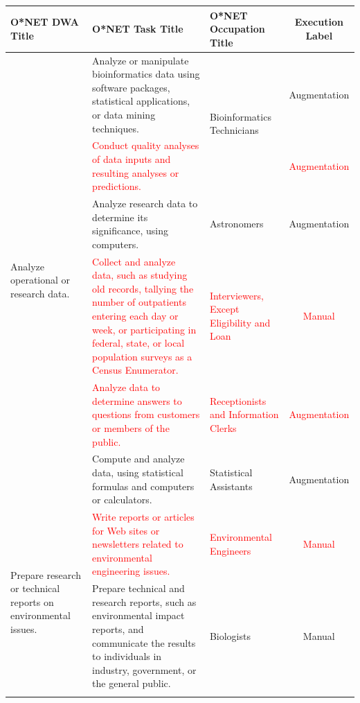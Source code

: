\begin{tabular}{|l|p{15cm}|l|c|}
\hline
\textbf{O*NET DWA Title} & \textbf{O*NET Task Title} & \textbf{O*NET Occupation Title} & \textbf{Execution Label} \\
\hline

\multirow{6}{*}{Analyze operational or research data.} &
Analyze or manipulate bioinformatics data using software packages, statistical applications, or data mining techniques. &
\multirow{2}{*}{Bioinformatics Technicians} & Augmentation \\ \cline{2-2}\cline{4-4}

& \textcolor{red}{Conduct quality analyses of data inputs and resulting analyses or predictions.} &
& \textcolor{red}{Augmentation} \\ \cline{2-4}

& Analyze research data to determine its significance, using computers. &
Astronomers & Augmentation \\ \cline{2-4}

& \textcolor{red}{Collect and analyze data, such as studying old records, tallying the number of outpatients entering each day or week, or participating in federal, state, or local population surveys as a Census Enumerator.} &
\textcolor{red}{Interviewers, Except Eligibility and Loan} & \textcolor{red}{Manual} \\ \cline{2-4}

& \textcolor{red}{Analyze data to determine answers to questions from customers or members of the public.} &
\textcolor{red}{Receptionists and Information Clerks} & \textcolor{red}{Augmentation} \\ \cline{2-4}

& Compute and analyze data, using statistical formulas and computers or calculators. &
Statistical Assistants & Augmentation \\ \hline


\multirow{8}{*}{Prepare research or technical reports on environmental issues.} &
\textcolor{red}{Write reports or articles for Web sites or newsletters related to environmental engineering issues.} &
\textcolor{red}{Environmental Engineers} & \textcolor{red}{Manual} \\ \cline{2-4}

& Prepare technical and research reports, such as environmental impact reports, and communicate the results to individuals in industry, government, or the general public. &
Biologists & Manual \\ \cline{2-4}


\end{tabular}
